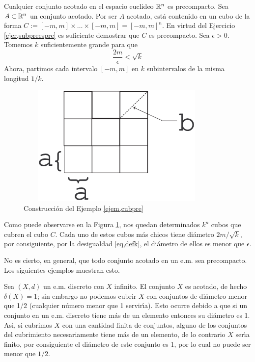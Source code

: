 \begin{ejemplo}\label{ejem,cubpre} Cualquier conjunto  acotado en el espacio euclideo
$\rr^n$ es precompacto. Sea $A\subset\rr^n$ un conjunto acotado.
Por ser $A$ acotado, est\'a contenido en un cubo de la forma
$C:=[-m,m]\times\dots\times [-m,m]=[-m,m]^n$. En virtud del
Ejercicio \vref{ejer,subpreespre} es suficiente demostrar que $C$
es precompacto. Sea $\epsilon>0$. Tomemos $k$ suficientemente
grande para que
\begin{equation}\label{eq,defk}
    \frac{2m}{\epsilon}<\sqrt{k}
\end{equation}
Ahora, partimos cada intervalo $[-m,m]$ en $k$ subintervalos de la
misma longitud $1/k$.

\begin{figure}[h]
\begin{center}
    \includegraphics[height=6cm, width=10cm]{cubpre.eps}
    \caption{Construcci\'on del Ejemplo
    \ref{ejem,cubpre}}\label{fig,cubpre}
\end{center}
\end{figure}

Como puede observarse en la Figura \ref{fig,cubpre}, nos quedan
determinados $k^n$ cubos que cubren el cubo $C$. Cada uno de estos
cubos m\'as chicos tiene di\'ametro $2m/\sqrt{k}$, por
consiguiente, por la desigualdad \ref{eq,defk}, el di\'ametro de
ellos es menor que $\epsilon$.
\end{ejemplo}

No es cierto, en general, que todo conjunto acotado en un e.m. sea
precompacto. Los siguientes ejemplos muestran esto.

\begin{ejemplo} Sea $(X,d)$ un e.m. discreto con $X$ infinito. El
conjunto $X$ es acotado, de hecho $\delta(X)=1$; sin embargo no
podemos cubrir $X$ con conjuntos de di\'ametro menor que 1/2
(cualquier n\'umero menor que 1 servir\'{\i}a). Esto ocurre debido
a que si un conjunto en un e.m. discreto tiene m\'as de un
elemento entonces su di\'ametro es 1. As\'{\i}, si cubrimos $X$
con una cantidad finita de conjuntos, alguno de los conjuntos del
cubrimiento necesariamente tiene m\'as de un elemento, de lo
contrario $X$ ser\'{\i}a finito, por consiguiente el di\'ametro de
este conjunto es 1, por lo cual no puede ser menor que $1/2$.
\end{ejemplo}

